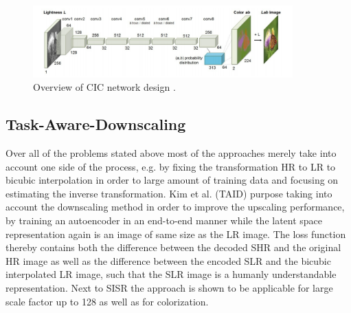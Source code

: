 \begin{figure}[!htbp]
	\centering
	\includegraphics[width=10cm]{figures/cic}
	\caption{Overview of CIC network design \cite{CIC}.}
  \label{fig:cic}
\end{figure}

\subsection{Task-Aware-Downscaling}
Over all of the problems stated above most of the approaches merely take into
account one side of the process, e.g. by fixing the transformation HR to LR
to bicubic interpolation in order to large amount of training data and focusing
on estimating the inverse transformation. Kim et al. \cite{TAID} (TAID) purpose taking
into account the downscaling method in order to improve the upscaling performance,
by training an autoencoder in an end-to-end manner while the latent space
representation again is an image of same size as the LR image. The loss function
thereby contains both the difference between the decoded SHR and the original HR
image as well as the difference between the encoded SLR and the bicubic
interpolated LR image, such that the SLR image is a humanly understandable
representation. Next to SISR the approach is shown to be applicable for large
scale factor up to 128 as well as for colorization.


%
